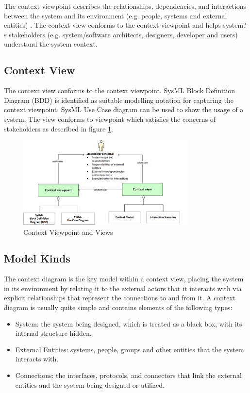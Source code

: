 \documentclass[letterpaper, 10 pt, conference]{ieeeconf}  %
\begin{document}
The context viewpoint describes the relationships, dependencies, and interactions between the system and its environment (e.g. people, systems and external entities) \cite{woods}. The context view conforms to the context viewpoint and helps system?s stakeholders (e.g. system/software architects, designers, developer and users) understand the system context.

\subsection{Context View}

The context view conforms to the context viewpoint. SysML Block Definition Diagram (BDD) is identified as suitable modelling notation for capturing the context viewpoint. SysML Use Case diagram can be used to show the usage of a system. The view conforms to viewpoint which satisfies the concerns of stakeholders as described in figure \ref{contextVP_view}.

\begin{figure}[t!]
	\centering
	\includegraphics[width=0.80\textwidth]{contextVP_view}
	\caption{Context Viewpoint and Views}
	\label{contextVP_view}
	\centering
\end{figure}

\subsection{Model Kinds}

The context diagram is the key model within a context view, placing the system in its environment by relating it to the external actors that it interacts with via explicit relationships that represent the connections to and from it. A context diagram is usually quite simple and contains elements of the following types:
\begin{itemize}
	\item System: the system being designed, which is treated as a black box, with its internal structure hidden.
	\item External Entities: systems, people, groups and other entities that the system interacts with.
	\item Connections: the interfaces, protocols, and connectors that link the external entities and the system being designed or utilized.
\end{itemize}
\end{document}
